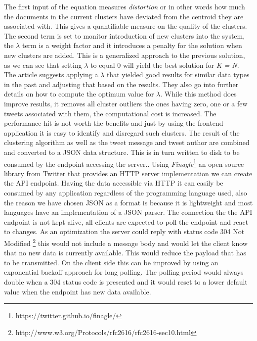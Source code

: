 The first input of the equation measures \textit{distortion} or in other words how much the documents in the current clusters have deviated from the centroid they are associated with. This gives a quantifiable measure on the quality of the clusters. The second term is set to monitor introduction of new clusters into the system, the $\lambda$ term is a weight factor and it introduces a penalty for the solution when new clusters are added. This is a generalized approach to the previous solution, as we can see that setting $\lambda$ to equal 0 will yield the best solution for \textit{K = N}. The article suggests applying a $\lambda$ that yielded good results for similar data types in the past and adjusting that based on the results. They also go into further details on how to compute the optimum value for $\lambda$.
\newline
While this method does improve results, it removes all cluster outliers the ones having zero, one or a few tweets associated with them, the computational cost is increased. The performance hit is not worth the benefits and just by using the frontend application it is easy to identify and disregard such clusters.
\newline
The result of the clustering algorithm as well as the tweet message and tweet author are combined and converted to a JSON data structure. This is in turn written to disk to be consumed by the endpoint accessing the server.. Using \textit{Finagle}\footnote{https://twitter.github.io/finagle/} an open source library from Twitter that provides an HTTP server implementation we can create the API endpoint.
\newline
Having the data accessible via HTTP it can easily be consumed by any application regardless of the programming language used, also the reason we have chosen JSON as a format is because it is lightweight and most languages have an implementation of a JSON parser. The connection the the API endpoint is not kept alive, all clients are expected to poll the endpoint and react to changes. As an optimization the server could reply with status code 304 Not Modified \footnote{http://www.w3.org/Protocols/rfc2616/rfc2616-sec10.html} this would not include a message body and would let the client know that no new data is currently available. This would reduce the payload that has to be transmitted. On the client side this can be improved by using an exponential backoff approach for long polling. The polling period would always double when a 304 status code is presented and it would reset to a lower default value when the endpoint has new data available.

